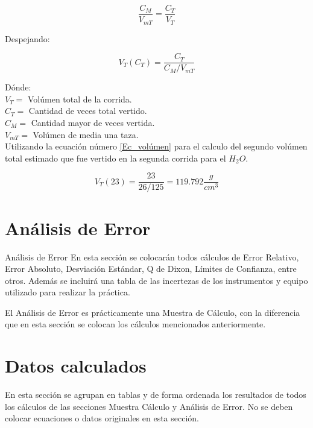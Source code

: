 \documentclass[12pt,letterpaper]{article}
\begin{document}
\[\frac{C_{M}}{V_{mT}} =  \frac{C_{T}}{V_{T}} \]


Despejando:


\begin{equation}
V_{T} (C_{T}) = \dfrac{C_{T}}{C_{M}/V_{mT}}
\label{Ec_volúmen}
\end{equation}


Dónde:\\
$V_{T} =$ Volúmen total de la corrida.\\
$C_{T} =$ Cantidad de veces total vertido.\\
$C_{M} =$ Cantidad mayor de veces vertida.\\
$V_{mT} =$ Volúmen de media una taza.\\



Utilizando la ecuación número \ref{Ec_volúmen} para el calculo del segundo volúmen total estimado que fue vertido en la segunda corrida para el $H_{2}O$.


\[V_{T} (23) = \dfrac{23}{26/125} = 119.792 \dfrac{g}{cm^{3}}\]




\section{Análisis de Error}

Análisis de Error En esta sección se colocarán todos cálculos de Error Relativo, Error Absoluto, Desviación Estándar, Q de Dixon, Límites de Confianza, entre otros. Además se incluirá una tabla de las incertezas de los instrumentos y equipo utilizado para realizar la práctica. \cite[p. 215]{greenwade93} \

El Análisis de Error es prácticamente una Muestra de Cálculo, con la diferencia que en esta sección se colocan los cálculos mencionados anteriormente. \cite{Einstein}


\section{Datos calculados}

En esta sección se agrupan en tablas y de forma ordenada los resultados de todos los cálculos de las secciones Muestra Cálculo y Análisis de Error. No se deben colocar ecuaciones o datos originales en esta sección. \cite{Freud}






\end{document}
